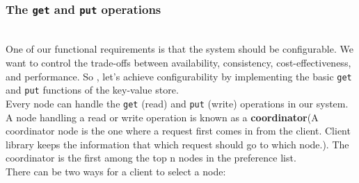 \subsubsection{\texorpdfstring{The \texttt{get} and \texttt{put} operations}{The get and put operations}}\label{eKcPvqi9v6ZCjm1qTyVZH}
\\
One of our functional requirements is that the system should be configurable. We want to control the trade-offs between availability, consistency, cost-effectiveness, and performance. So , let's achieve configurability by implementing the basic \texttt{get} and \texttt{put} functions of the key-value store.
\\
Every node can handle the \texttt{get} (read) and \texttt{put} (write) operations in our system. A node handling a read or write operation is known as a \textbf{coordinator}(A coordinator node is the one where a request first comes in from the client. Client library keeps the information that which request should go to which node.). The coordinator is the first among the top \protect{}\label{katex_inline_oi2cwA3CZQxpqTyOSPtxR}{{{\(\text{n}\)}}} nodes in the preference list.
\\
There can be two ways for a client to select a node:

